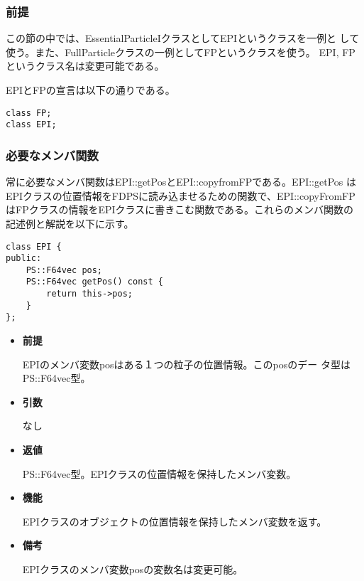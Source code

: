 \subsubsection{前提}

この節の中では、EssentialParticleIクラスとしてEPIというクラスを一例と
して使う。また、FullParticleクラスの一例としてFPというクラスを使う。
EPI, FPというクラス名は変更可能である。

EPIとFPの宣言は以下の通りである。
\begin{screen}
\begin{verbatim}
class FP;
class EPI;
\end{verbatim}
\end{screen}

\subsubsection{必要なメンバ関数}


常に必要なメンバ関数はEPI::getPosとEPI::copyfromFPである。EPI::getPos
はEPIクラスの位置情報をFDPSに読み込ませるための関数で、EPI::copyFromFP
はFPクラスの情報をEPIクラスに書きこむ関数である。これらのメンバ関数の
記述例と解説を以下に示す。


\begin{screen}
\begin{verbatim}
class EPI {
public:
    PS::F64vec pos;
    PS::F64vec getPos() const {
        return this->pos;
    }
};
\end{verbatim}
\end{screen}

\begin{itemize}

\item {\bf 前提}
  
  EPIのメンバ変数posはある１つの粒子の位置情報。このposのデー
  タ型はPS::F64vec型。
  
\item {\bf 引数}

  なし
  
\item {\bf 返値}

  PS::F64vec型。EPIクラスの位置情報を保持したメンバ変数。
  
\item {\bf 機能}

  EPIクラスのオブジェクトの位置情報を保持したメンバ変数を返す。
  
\item {\bf 備考}

  EPIクラスのメンバ変数posの変数名は変更可能。

\end{itemize}

